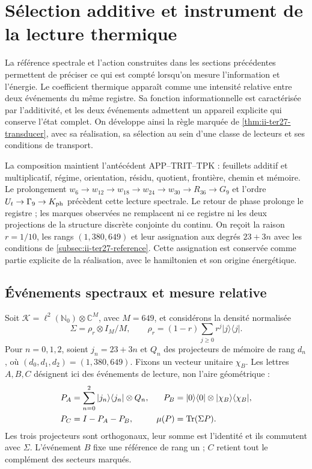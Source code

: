 \section{Sélection additive et instrument de la lecture thermique}
\label{sec:ii-aditiva-instrumento}

La référence spectrale et l’action construites dans les sections précédentes
permettent de préciser ce qui est compté lorsqu’on mesure l’information et l’énergie. Le coefficient
thermique apparaît comme une intensité relative entre deux événements du même
registre. Sa fonction informationnelle est caractérisée par l’additivité, et
les deux événements admettent un appareil explicite qui conserve l’état complet.
On développe ainsi la règle marquée de
\ref{thm:ii-ter27-transducer}, avec sa réalisation, sa sélection au sein d’une
classe de lecteurs et ses conditions de transport.

La composition maintient l’antécédent APP--TRIT--TPK : feuillets additif et
multiplicatif, régime, orientation, résidu, quotient, frontière, chemin et
mémoire. Le prolongement
$w_6\to w_{12}\to w_{18}\to w_{24}\to w_{30}\to R_{36}\to G_9$
et l’ordre $U_t\to\Gamma_9\to K_{\rm ph}$ précèdent cette lecture
spectrale. Le retour de phase prolonge le registre ; les marques observées
ne remplacent ni ce registre ni les deux projections de la structure discrète
conjointe du continu. On reçoit la raison $r=1/10$, les rangs
$(1,380,649)$ et leur assignation aux degrés $23+3n$ avec les conditions de
\ref{subsec:ii-ter27-reference}. Cette assignation est conservée comme partie
explicite de la réalisation, avec le hamiltonien et son origine énergétique.

\subsection{Événements spectraux et mesure relative}
\label{subsec:ii-tins-eventos}

Soit $\mathcal K=\ell^2(\mathbb N_0)\otimes\mathbb C^M$, avec $M=649$,
et considérons la densité normalisée
\begin{equation}
 \Sigma=\rho_r\otimes I_M/M,\qquad
 \rho_r=(1-r)\sum_{j\ge0}r^j|j\rangle\langle j|.
 \label{eq:ii-tins-sigma}
\end{equation}
Pour $n=0,1,2$, soient $j_n=23+3n$ et $Q_n$ des projecteurs de mémoire de rang
$d_n$, où $(d_0,d_1,d_2)=(1,380,649)$. Fixons un vecteur unitaire $\chi_B$.
Les lettres $A,B,C$ désignent ici des événements de lecture, non l’aire géométrique :
\begin{align}
 P_A&=\sum_{n=0}^2|j_n\rangle\langle j_n|\otimes Q_n,&
 P_B&=|0\rangle\langle0|\otimes|\chi_B\rangle\langle \chi_B|,
 \nonumber\\
 P_C&=I-P_A-P_B,& \mu(P)&=\operatorname{Tr}(\Sigma P).
 \label{eq:ii-tins-marks}
\end{align}
Les trois projecteurs sont orthogonaux, leur somme est l’identité et ils commutent avec
$\Sigma$. L’événement $B$ fixe une référence de rang un ; $C$ retient tout
le complément des secteurs marqués.

